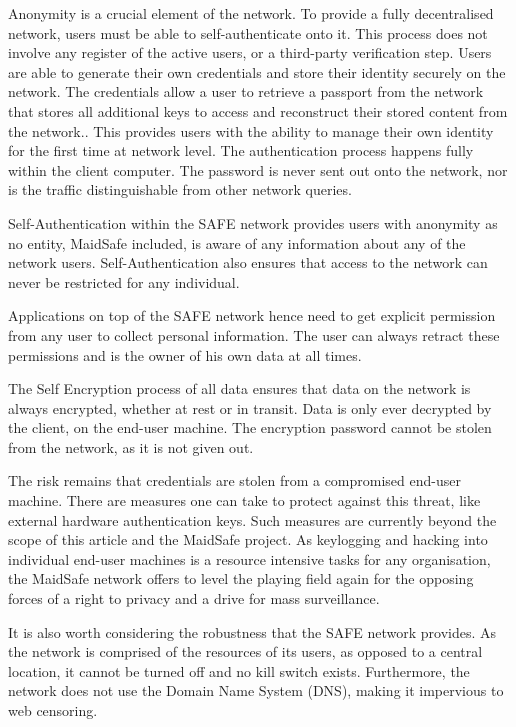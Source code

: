 \documentclass[twocolumn,english]{article}
\begin{document}
Anonymity is a crucial element of the network. To provide a fully decentralised network, users must be able to self-authenticate onto it.  This process does not involve any register of the active users, or a third-party verification step.  Users are able to generate their own credentials and store their identity securely on the network. The credentials allow a user to retrieve a passport from the network that stores all additional keys to access and reconstruct their stored content from the network.\cite{msSA}. This provides users with the ability to manage their own
identity for the first time at network level.  The authentication process happens fully within the client computer. The password is never sent out onto the network, nor is the traffic distinguishable from other network queries.

Self-Authentication within the SAFE network provides users
with anonymity as no entity, MaidSafe included, is aware of any information
about any of the network users. Self-Authentication also ensures
that access to the network can never be restricted for any individual.

Applications on top of the SAFE network hence need to get explicit permission from any user to collect personal information.  The user can always retract these permissions and is the owner of his own data at all times.

The Self Encryption process of all data ensures that data on the network is
always encrypted, whether at rest or in transit. Data is only
ever decrypted by the client, on the end-user machine.  The encryption
password cannot be stolen from the network, as it is not given out.  

The risk remains that credentials are stolen from a compromised end-user machine.  There are measures one can take to protect against this threat, like external hardware authentication keys.  Such measures are currently beyond the scope of this article and the MaidSafe project.  As keylogging and hacking into individual end-user machines is a resource intensive tasks for any organisation, the MaidSafe network offers to level the playing field again for the opposing forces of a right to privacy and a drive for mass surveillance.

It is also worth considering the robustness that the SAFE network
provides. As the network is comprised of the resources of its users,
as opposed to a central location, it cannot be turned off and no kill
switch exists. Furthermore, the network does not use the Domain Name
System (DNS), making it impervious to web censoring. %
\end{document}
